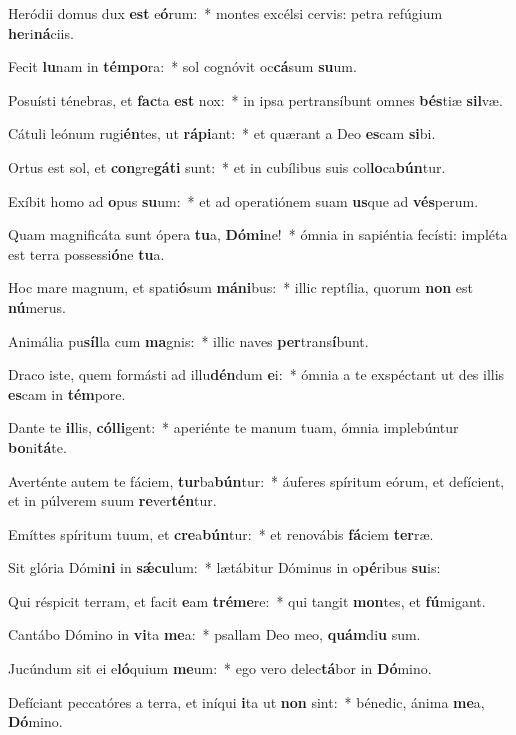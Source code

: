 \item Heródii domus dux \textbf{est} e\textbf{ó}rum:~* montes excélsi cervis: petra refúgium \textbf{he}ri\textbf{ná}ciis.
\item Fecit \textbf{lu}nam in \textbf{tém}\textbf{po}ra:~* sol cognóvit oc\textbf{cá}sum \textbf{su}um.
\item Posuísti ténebras, et \textbf{fac}ta \textbf{est} nox:~* in ipsa pertransíbunt omnes \textbf{bés}tiæ \textbf{sil}væ.
\item Cátuli leónum rugi\textbf{én}tes, ut \textbf{rá}\textbf{pi}ant:~* et quærant a Deo \textbf{es}cam \textbf{si}bi.
\item Ortus est sol, et \textbf{con}gre\textbf{gá}\textbf{ti} sunt:~* et in cubílibus suis col\textbf{lo}ca\textbf{bún}tur.
\item Exíbit homo ad \textbf{o}pus \textbf{su}um:~* et ad operatiónem suam \textbf{us}que ad \textbf{vés}perum.
\item Quam magnificáta sunt ópera \textbf{tu}a, \textbf{Dó}\textbf{mi}ne!~* ómnia in sapiéntia fecísti: impléta est terra possessi\textbf{ó}ne \textbf{tu}a.
\item Hoc mare magnum, et spati\textbf{ó}sum \textbf{má}\textbf{ni}bus:~* illic reptília, quorum \textbf{non} est \textbf{nú}merus.
\item Animália pu\textbf{síl}la cum \textbf{ma}gnis:~* illic naves \textbf{per}trans\textbf{í}bunt.
\item Draco iste, quem formásti ad illu\textbf{dén}dum \textbf{e}i:~* ómnia a te exspéctant ut des illis \textbf{es}cam in \textbf{tém}pore.
\item Dante te \textbf{il}lis, \textbf{cól}\textbf{li}gent:~* aperiénte te manum tuam, ómnia implebúntur \textbf{bo}ni\textbf{tá}te.
\item Averténte autem te fáciem, \textbf{tur}ba\textbf{bún}tur:~* áuferes spíritum eórum, et defícient, et in púlverem suum \textbf{re}ver\textbf{tén}tur.
\item Emíttes spíritum tuum, et \textbf{cre}a\textbf{bún}tur:~* et renovábis \textbf{fá}ciem \textbf{ter}ræ.
\item Sit glória Dómi\textbf{ni} in \textbf{sǽ}\textbf{cu}lum:~* lætábitur Dóminus in o\textbf{pé}ribus \textbf{su}is:
\item Qui réspicit terram, et facit \textbf{e}am \textbf{tré}\textbf{me}re:~* qui tangit \textbf{mon}tes, et \textbf{fú}migant.
\item Cantábo Dómino in \textbf{vi}ta \textbf{me}a:~* psallam Deo meo, \textbf{quám}di\textbf{u} sum.
\item Jucúndum sit ei e\textbf{ló}quium \textbf{me}um:~* ego vero delec\textbf{tá}bor in \textbf{Dó}mino.
\item Defíciant peccatóres a terra, et iníqui \textbf{i}ta ut \textbf{non} sint:~* bénedic, ánima \textbf{me}a, \textbf{Dó}mino.
